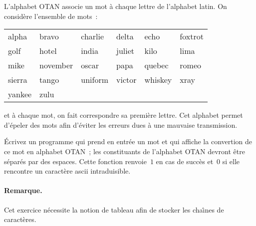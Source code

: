 \begin{exercice}
L'alphabet OTAN associe un mot \`a chaque  lettre de l'alphabet latin. 
On consid\`ere l'ensemble de mots~:
\par
\begin{tabular}{llllll}
alpha & bravo & charlie & delta & echo & foxtrot \\
 golf & hotel & india & juliet & kilo & lima \\
mike & november & oscar & papa & quebec & romeo \\
sierra & tango & uniform & victor  & whiskey & xray \\
yankee & zulu 
\end{tabular}
\par
et \`a chaque mot,   on fait correspondre  sa premi\`ere  lettre.  Cet
alphabet permet  d'\'epeler des mots  afin d'\'eviter les erreurs dues
\`a une mauvaise transmission.
\par\medskip
\'Ecrivez un programme qui prend en entr\'ee un mot  et qui affiche la
convertion de ce mot en alphabet OTAN~; les constituants de l'alphabet
OTAN  devront  \^etre  s\'epar\'es  par  des  espaces.  Cette fonction
renvoie~$1$ en cas de succ\`es et~$0$ si elle rencontre un caract\`ere
ascii intraduisible.  
\paragraph{Remarque.} 
Cet exercice n\'ecessite la notion de tableau afin de stocker les
cha\^\i{}nes de caract\`eres.  
\ifcorrection
\begin{correction}

\end{correction}
\fi
\end{exercice}